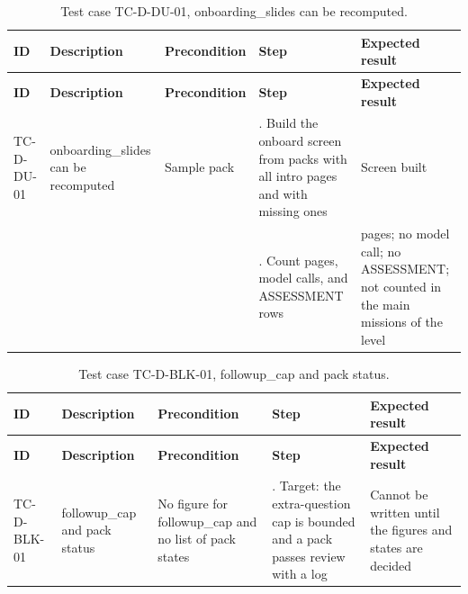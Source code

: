 {\small
\begin{longtable}{|>{\raggedright\arraybackslash}p{}|>{\raggedright\arraybackslash}p{}|>{\raggedright\arraybackslash}p{}|>{\raggedright\arraybackslash}p{}|>{\raggedright\arraybackslash}p{}|}
\caption{Test case TC-D-DU-01, onboarding\_slides can be recomputed.} \\
\hline
\textbf{ID} & \textbf{Description} & \textbf{Precondition} & \textbf{Step} & \textbf{Expected result} \\ \hline
\endfirsthead
\hline
\textbf{ID} & \textbf{Description} & \textbf{Precondition} & \textbf{Step} & \textbf{Expected result} \\ \hline
\endhead
TC-D-DU-01 & onboarding\_slides can be recomputed & Sample pack & 1. Build the onboard screen from packs with all intro pages and with missing ones & Screen built \\ \hline
 &  &  & 2. Count pages, model calls, and ASSESSMENT rows & 6 pages; no model call; no ASSESSMENT; not counted in the main missions of the level \\ \hline
\end{longtable}
}

{\small
\begin{longtable}{|>{\raggedright\arraybackslash}p{}|>{\raggedright\arraybackslash}p{}|>{\raggedright\arraybackslash}p{}|>{\raggedright\arraybackslash}p{}|>{\raggedright\arraybackslash}p{}|}
\caption{Test case TC-D-BLK-01, followup\_cap and pack status.} \\
\hline
\textbf{ID} & \textbf{Description} & \textbf{Precondition} & \textbf{Step} & \textbf{Expected result} \\ \hline
\endfirsthead
\hline
\textbf{ID} & \textbf{Description} & \textbf{Precondition} & \textbf{Step} & \textbf{Expected result} \\ \hline
\endhead
TC-D-BLK-01 & followup\_cap and pack status & No figure for followup\_cap and no list of pack states & 1. Target: the extra-question cap is bounded and a pack passes review with a log & Cannot be written until the figures and states are decided \\ \hline
\end{longtable}
}

